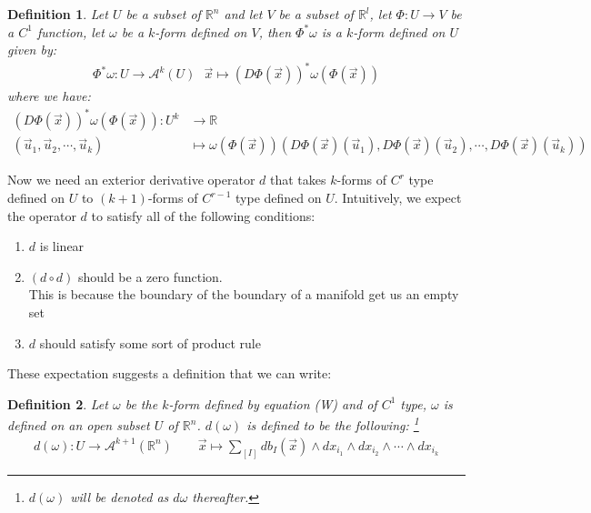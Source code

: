 \documentclass[15pt]{book}
\theoremstyle{break}
\theoremstyle{break}
\newtheorem{defn}{Definition}[corL]
\newcommand{\R}{\mathbb{R}}
\newcommand{\A}{\mathcal{A}}
\begin{document}
\begin{defn}
Let $U$ be a subset of $\R^n$ and let $V$ be a subset of $\R^l$, let $\Phi:U \to V$ be a $C^1$ function, let $\omega$ be a $k$-form defined on $V$, then $\Phi^*\omega$ is a $k$-form defined on $U$ given by:
\begin{align*}
\Phi^*\omega: U \to \A^k(U) \ \ \ \vec{x}\mapsto (D\Phi(\vec{x}))^*\omega(\Phi(\vec{x}))
\end{align*}
where we have:
\begin{align*}
(D\Phi(\vec{x}))^*\omega(\Phi(\vec{x})): U^k &\to \R \\ 
(\vec{u}_1,\vec{u}_2,\cdots, \vec{u}_k) &\mapsto \omega(\Phi(\vec{x}))(D\Phi(\vec{x})(\vec{u}_1), D\Phi(\vec{x})(\vec{u}_2), \cdots , D\Phi(\vec{x})(\vec{u}_k))
\end{align*}
\end{defn}

\newpage
Now we need an exterior derivative operator $d$ that takes $k$-forms of $C^r$ type defined on $U$ to $(k+1)$-forms of $C^{r-1}$ type defined on $U$. Intuitively, we expect the operator $d$ to satisfy all of the following conditions:
\begin{enumerate}[topsep=3pt,itemsep=-1ex,partopsep=1ex,parsep=1ex]
\item $d$ is linear
\item $(d \circ d)$ should be a zero function. \\This is because the boundary of the boundary of a manifold get us an empty set
\item $d$ should satisfy some sort of product rule 
\end{enumerate} These expectation suggests a definition that we can write:

\begin{defn}
Let $\omega$ be the $k$-form defined by equation (W) and of $C^1$ type, $\omega$ is defined on an open subset $U$ of $\R^n$. $d(\omega)$ is defined to be the following: \footnote{$d(\omega)$ will be denoted as $d\omega$ thereafter.}
\begin{align*}
d\left( \omega \right):U \to \A^{k+1}(\R^n) \qquad \vec{x}\mapsto \sum_{[I]} db_I(\vec{x})\wedge dx_{i_1}\wedge dx_{i_2}\wedge \cdots \wedge dx_{i_k} 
\end{align*}
\end{defn}
\end{document}
